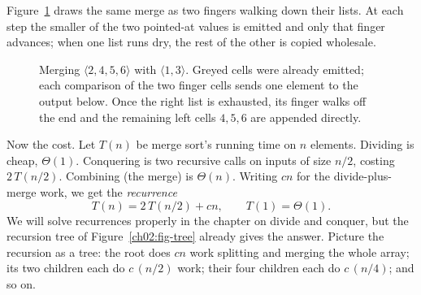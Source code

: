 Figure~\ref{ch02:fig-merge} draws the same merge as two fingers walking down their
lists. At each step the smaller of the two pointed-at values is emitted and only that
finger advances; when one list runs dry, the rest of the other is copied wholesale.

\begin{figure}[H]
\centering
{}
\caption{Merging $\langle 2,4,5,6\rangle$ with $\langle 1,3\rangle$. Greyed cells were
already emitted; each comparison of the two finger cells sends one element to the output
below. Once the right list is exhausted, its finger walks off the end and the remaining
left cells $4,5,6$ are appended directly.}
\label{ch02:fig-merge}
\end{figure}

Now the cost. Let $T(n)$ be merge sort's running time on $n$ elements. Dividing is
cheap, $\Theta(1)$. Conquering is two recursive calls on inputs of size $n/2$, costing
$2\,T(n/2)$. Combining (the merge) is $\Theta(n)$. Writing $cn$ for the divide-plus-merge
work, we get the \emph{recurrence}
\[
T(n) = 2\,T(n/2) + cn, \qquad T(1) = \Theta(1).
\]
We will solve recurrences properly in the chapter on divide and conquer, but the
recursion tree of Figure~\ref{ch02:fig-tree} already gives the answer. Picture the
recursion as a tree: the root does $cn$ work splitting and merging the whole array; its
two children each do $c\,(n/2)$ work; their four children each do $c\,(n/4)$; and so on.

